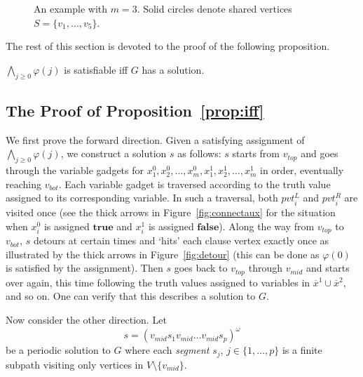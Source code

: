 \documentclass[envcountsame]{llncs}
\begin{document}
\begin{figure}[h]
\caption{An example with $m = 3$. Solid circles denote shared vertices $S = \{v_1, \ldots, v_5\}$.}
\label{fig:stack}
\end{figure}

The rest of this section is devoted to the proof of the following proposition.
\begin{proposition}\label{prop:iff}
$\bigwedge_{j \geq 0} \varphi(j)$ is satisfiable iff $G$ has a solution.
\end{proposition}
\subsection{The Proof of Proposition~\ref{prop:iff}}

We first prove the forward direction. Given a satisfying assignment of
$\bigwedge_{j \geq 0} \varphi(j)$, we construct a solution $s$ as follows: $s$ starts from $v_{top}$
and goes through the variable gadgets for $x_1^0, x_2^0, \ldots, x_m^0, x_1^1, x_2^1, \ldots, x_m^1$ in order,
eventually reaching $v_{bot}$. Each variable gadget is traversed according to the
truth value assigned to its corresponding variable. In such a traversal,
both $\mathit{pvt}_i^L$ and $\mathit{pvt}_i^R$ are visited once
(see the thick arrows in Figure~\ref{fig:connectaux} for the situation when $x_i^0$ is assigned $\mathbf{true}$
and $x_i^1$ is assigned $\mathbf{false}$).
Along the way from $v_{top}$ to $v_{bot}$, $s$ detours at certain times and `hits' each clause vertex
exactly once as illustrated by the thick arrows in Figure~\ref{fig:detour}
(this can be done as $\varphi(0)$ is satisfied by the assignment).
Then $s$ goes back to $v_{top}$ through $v_{mid}$ and starts over again, this time following 
the truth values assigned to variables in $\overline{x}^1 \cup \overline{x}^2$, and so on.
One can verify that this describes a solution to $G$.

Now consider the other direction. Let 
\[
s = (v_{mid} s_1 v_{mid} \ldots v_{mid} s_p)^\omega
\]
be a periodic solution to $G$ where each \emph{segment} $s_j$, $j \in \{1, \ldots, p \}$ is a
finite subpath visiting only vertices in $V \setminus \{ v_{mid} \}$.
\end{document}
